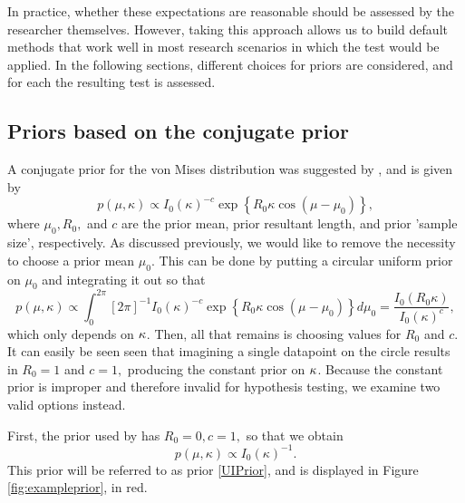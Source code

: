 In practice, whether these expectations are reasonable should be assessed by the researcher themselves. However, taking this approach allows us to build default methods that work well in most research scenarios in which the test would be applied. In the following sections, different choices for priors are considered, and for each the resulting test is assessed.


\subsection{Priors based on the conjugate prior}
\label{sub:ConjugatePrior}

A conjugate prior for the von Mises distribution was suggested by \citet{guttorp1988finding}, and is given by
\begin{equation}
p(\mu, \kappa) \propto I_0(\kappa)^{-c} \exp \left\{ R_0 \kappa \cos(\mu - \mu_0) \right\},
\end{equation}
where \( \mu_0, R_0, \) and \( c \) are the prior mean, prior resultant length, and prior 'sample size', respectively. As discussed previously, we would like to remove the necessity to choose a prior mean \( \mu_0.\) This can be done by putting a circular uniform prior on \( \mu_0 \) and integrating it out so that
\begin{equation}
p(\mu, \kappa) \propto \int_0^{2 \pi} [2\pi ]^{-1} I_0(\kappa)^{-c} \exp \left\{ R_0 \kappa \cos(\mu - \mu_0) \right\} d\mu_0 = \frac{I_0(R_0 \kappa)}{I_0(\kappa)^{c}},
\end{equation}
which only depends on \( \kappa\). Then, all that remains is choosing values for \( R_0 \) and \( c \). It can easily be seen seen that imagining a single datapoint on the circle results in \( R_0 = 1 \) and \( c = 1,\) producing the constant prior on \(\kappa\). Because the constant prior is improper and therefore invalid for hypothesis testing, we examine two valid options instead. %

First, the prior used by \citet{mcvinish2008semiparametric} has \( R_0 = 0, c = 1, \) so that we obtain
\begin{equation} \label{UIPrior} %
p(\mu, \kappa) \propto I_0(\kappa)^{-1}.
\end{equation}
This prior will be referred to as prior \ref{UIPrior}, and is displayed in Figure \ref{fig:exampleprior}, in red.

